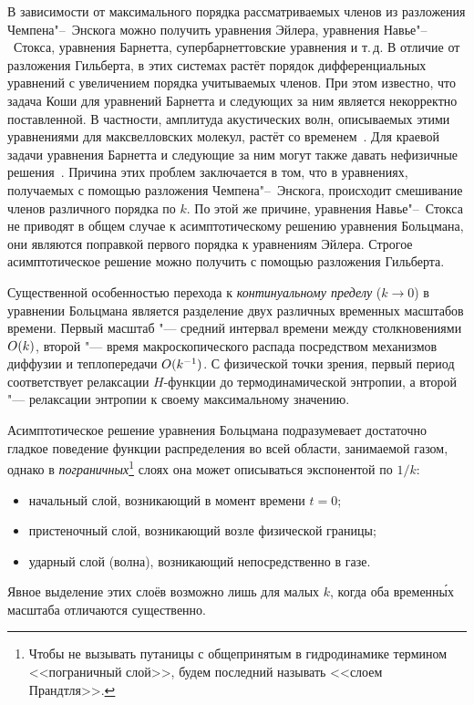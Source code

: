 В зависимости от максимального порядка рассматриваемых членов из разложения Чемпена"--~Энскога
можно получить уравнения Эйлера, уравнения Навье"--~Стокса, уравнения Барнетта, супербарнеттовские уравнения и т.\,д.
В отличие от разложения Гильберта, в этих системах растёт порядок дифференциальных уравнений
с увеличением порядка учитываемых членов. При этом известно, что задача Коши для уравнений Барнетта
и следующих за ним является некорректно поставленной.
В частности, амплитуда акустических волн, описываемых этими уравнениями для максвелловских молекул,
растёт со временем~\cite{Bobylev1982}.
Для краевой задачи уравнения Барнетта и следующие за ним могут также давать нефизичные решения~\cite{Cercignani1973}.
Причина этих проблем заключается в том, что в уравнениях, получаемых с помощью разложения Чемпена"--~Энскога,
происходит смешивание членов различного порядка по \(k\).
По этой же причине, уравнения Навье"--~Стокса не приводят в общем случае
к асимптотическому решению уравнения Больцмана,
они являются поправкой первого порядка к уравнениям Эйлера.
Строгое асимптотическое решение можно получить с помощью разложения Гильберта.

Существенной особенностью перехода к \emph{континуальному пределу} (\(k\to0\)) в уравнении Больцмана
является разделение двух различных временных масштабов времени. Первый масштаб "--- средний интервал
времени между столкновениями \(O(k)\), второй "--- время макроскопического распада посредством
механизмов диффузии и теплопередачи \(O(k^{-1})\).
С физической точки зрения, первый период соответствует релаксации \(H\)-функции до термодинамической
энтропии, а второй "--- релаксации энтропии к своему максимальному значению.

Асимптотическое решение уравнения Больцмана подразумевает достаточно гладкое поведение
функции распределения во всей области, занимаемой газом, однако в \emph{пограничных}\footnote{
    Чтобы не вызывать путаницы с общепринятым в гидродинамике термином <<пограничный слой>>,
    будем последний называть <<слоем Прандтля>>.
} слоях она может описываться экспонентой по \(1/k\):
\begin{itemize}
    \item начальный слой, возникающий в момент времени \(t=0\);
    \item пристеночный слой, возникающий возле физической границы;
    \item ударный слой (волна), возникающий непосредственно в газе.
\end{itemize}
Явное выделение этих слоёв возможно лишь для малых \(k\),
когда оба временн\'{ы}х масштаба отличаются существенно.

